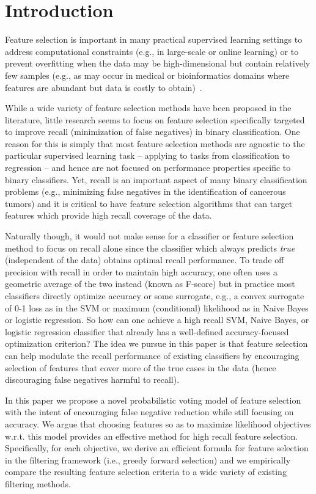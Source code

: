 \section{Introduction}

Feature selection is important in many practical supervised learning
settings to address computational constraints (e.g., in large-scale or
online learning) or to prevent overfitting when the data may be
high-dimensional but contain relatively few samples (e.g., as may
occur in medical or bioinformatics domains where features are abundant
but data is costly to obtain)~\cite{guyon_jmlr03}.

While a wide variety of feature selection methods have been proposed
in the literature, little research seems to focus on feature selection
specifically targeted to improve recall (minimization of false
negatives) in binary classification.  One reason for this is simply
that most feature selection methods are agnostic to the particular
supervised learning task -- applying to tasks from classification to
regression -- and hence are not focused on performance properties
specific to binary classifiers.  Yet, recall is an important aspect of
many binary classification problems (e.g., minimizing false negatives
in the identification of cancerous tumors) and it is critical to have
feature selection algorithms that can target features which provide
high recall coverage of the data.

Naturally though, it would not make sense for a classifier or feature
selection method to focus on recall alone since the classifier which
always predicts \emph{true} (independent of the data) obtains optimal
recall performance.  To trade off precision with recall in order to
maintain high accuracy, one often uses a geometric average of the two
instead (known as F-score) but in practice most classifiers directly
optimize accuracy or some surrogate, e.g., a convex surrogate of 0-1
loss as in the SVM or maximum (conditional) likelihood as in Naive
Bayes or logistic regression.  So how can one achieve a high recall
SVM, Naive Bayes, or logistic regression classifier that already has a
well-defined accuracy-focused optimization criterion?  The idea we
pursue in this paper is that feature selection can help modulate the
recall performance of existing classifiers by encouraging selection of
features that cover more of the true cases in the data (hence
discouraging false negatives harmful to recall).

In this paper we propose a novel probabilistic voting model of feature
selection with the intent of encouraging false negative reduction
while still focusing on accuracy.  We argue that choosing features so
as to maximize likelihood objectives w.r.t. this model provides an
effective method for high recall feature selection.  Specifically, for
each objective, we derive an efficient formula for feature selection
in the filtering framework (i.e., greedy forward selection) and we
empirically compare the resulting feature selection criteria to a wide
variety of existing filtering methods.

